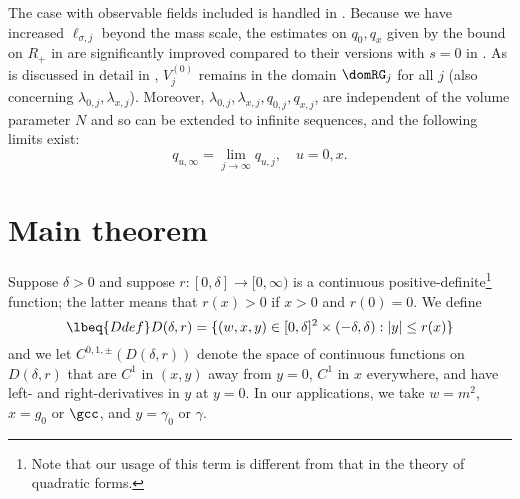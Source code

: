 The case with observable fields included is handled in \cite{ST-phi4}.
Because we have increased $\ell_{\sigma,j}$ beyond the mass scale, the
estimates on $q_0,q_x$ given by the bound on $R_+$ in  are
significantly improved compared to their versions with $s=0$ in \cite{ST-phi4}.
As is discussed in detail in  \cite[Section~\ref{phi4-sec:pfmr1}]{ST-phi4},
$V_j^{(0)}$ remains in the domain $\domRG_j$ for all $j$
(also concerning $\lambda_{0,j}, \lambda_{x,j}$).
Moreover,
$\lambda_{0,j}, \lambda_{x,j},q_{0,j},q_{x,j}$, are independent of the volume parameter $N$ and
so can be extended to infinite sequences, and the following limits exist:
\begin{equation}
q_{u,\infty} = \lim_{j\to\infty} q_{u,j}, \quad u = 0, x.
\end{equation}


\section{Main theorem}

Suppose $\delta > 0$ and suppose $r : [0, \delta] \to [0, \infty)$
is a continuous positive-definite\footnote{Note that our usage of this term is
different from that in the theory of quadratic forms.} function; the latter
means that $r(x) > 0$ if $x > 0$ and $r(0) = 0$.
We define
\begin{equation}
\lbeq{Ddef}
D(\delta, r)
	=
\{ (w, x, y) \in [0, \delta]^2 \times (-\delta, \delta) : |y| \leq r(x) \}
\end{equation}
and we let $C^{0,1,\pm}(D(\delta, r))$ denote the space of continuous functions on $D(\delta, r)$
that are $C^1$ in $(x, y)$ away from $y = 0$, $C^1$ in $x$ everywhere,
and have left- and right-derivatives in $y$ at $y = 0$.
In our applications, we take $w = m^2$, $x = g_0$ or $\gcc$,
and $y = \gamma_0$ or $\gamma$.

